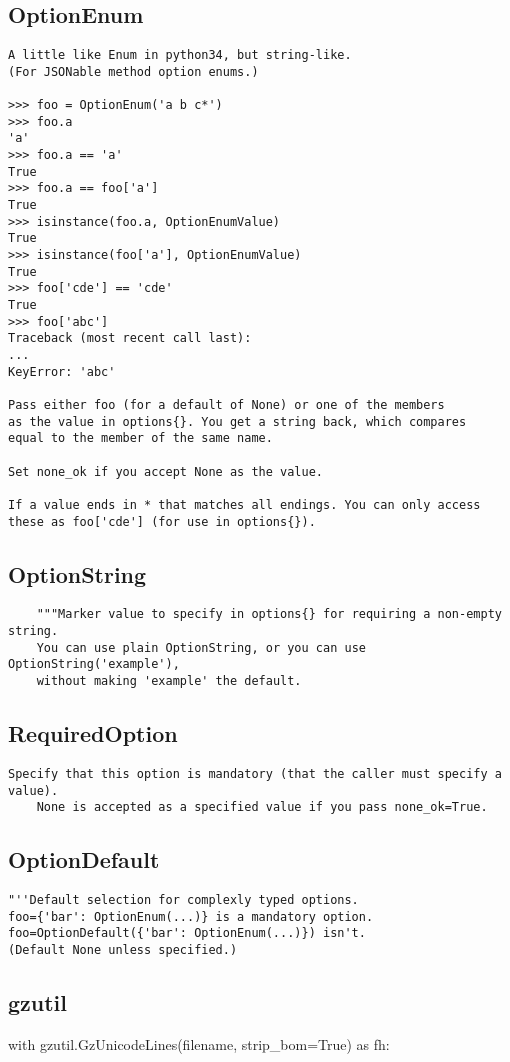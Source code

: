 \subsection{OptionEnum}
\begin{verbatim}
A little like Enum in python34, but string-like.
(For JSONable method option enums.)

>>> foo = OptionEnum('a b c*')
>>> foo.a
'a'
>>> foo.a == 'a'
True
>>> foo.a == foo['a']
True
>>> isinstance(foo.a, OptionEnumValue)
True
>>> isinstance(foo['a'], OptionEnumValue)
True
>>> foo['cde'] == 'cde'
True
>>> foo['abc']
Traceback (most recent call last):
...
KeyError: 'abc'

Pass either foo (for a default of None) or one of the members
as the value in options{}. You get a string back, which compares
equal to the member of the same name.

Set none_ok if you accept None as the value.

If a value ends in * that matches all endings. You can only access
these as foo['cde'] (for use in options{}).
\end{verbatim}



\subsection{OptionString}
\begin{verbatim}
    """Marker value to specify in options{} for requiring a non-empty string.
    You can use plain OptionString, or you can use OptionString('example'),
    without making 'example' the default.
\end{verbatim}



\subsection{RequiredOption}
\begin{verbatim}
Specify that this option is mandatory (that the caller must specify a value).
    None is accepted as a specified value if you pass none_ok=True.
\end{verbatim}



\subsection{OptionDefault}
\begin{verbatim}
"''Default selection for complexly typed options.
foo={'bar': OptionEnum(...)} is a mandatory option.
foo=OptionDefault({'bar': OptionEnum(...)}) isn't.
(Default None unless specified.)
\end{verbatim}



\subsection{gzutil}
\begin{python}
with gzutil.GzUnicodeLines(filename, strip_bom=True) as fh:
\end{python}
